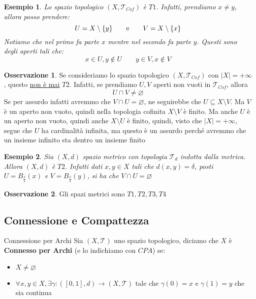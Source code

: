 \documentclass[11pt,a4paper,twoside]{article}
\newtheorem{es}{Esempio}
\theoremstyle{definition}
\newtheorem*{oss}{Osservazione}
\begin{document}
\begin{es}
	Lo spazio topologico $(X, \mathcal T_{Cof})$ è $T1$. Infatti, prendiamo $x \neq y$, allora posso prendere:
	\[U = X \setminus \{y\}\qquad \text e\qquad V = X \setminus \{x\}\]
	Notiamo che nel primo fa parte $x$ mentre nel secondo fa parte $y$. Questi sono degli aperti tali che:
	\[x \in U, y \not \in U\qquad y \in V, x \not \in V\]
\end{es}

\begin{oss}\label{conngros}
	Se consideriamo lo spazio topologico $(X, \mathcal T_{Cof})$ con $|X|=+\infty$, questo \underline{non è mai} $T2$. Infatti, se prendiamo $U,V$ aperti non vuoti in $\mathcal T_{Cof}$, allora
	\[ U \cap V \neq \varnothing \]
	Se per assurdo infatti avremmo che $V \cap U = \varnothing$, ne seguirebbe che $U \subseteq X \setminus V$. Ma $V$ è un aperto non vuoto, quindi nella topologia cofinita $X \setminus V$ è finito. Ma anche $U$ è un aperto non vuoto, quindi anche $X \setminus U$ è finito, quindi, visto che $|X| = +\infty$, segue che $U$ ha cardinalità infinita, ma questo è un assurdo perché avremmo che un insieme infinito sta dentro un insieme finito
\end{oss}

\begin{es}\label{dT2}
	Sia $(X, d)$ spazio metrico con topologia $\mathcal T_d$ indotta dalla metrica. Allora $(X, d)$ è $T2$.
	Infatti dati $x,y \in X$ tali che $d(x,y) = \delta$, posti $U = B_\frac \delta 2(x)$ e $V = B_\frac \delta 2(y)$, si ha che $V \cap U = \varnothing$
\end{es}

\begin{oss}
	Gli spazi metrici sono $T1,T2,T3,T4$
\end{oss}

\subsection{Connessione e Compattezza}

\begin{defn}{Connessione per Archi}{}
	Sia $(X, \mathcal T)$ uno spazio topologico, diciamo che $X$ è \textbf{Connesso per Archi} (e lo indichiamo con $CPA$) se:
	\begin{itemize}
		\item $X \neq \varnothing$
		\item $\forall x,y \in X, \exists \gamma:([0,1], d) \to (X, \mathcal T)$ tale che $\gamma(0)=x$ e $\gamma(1)=y$ che sia continua
	\end{itemize}
\end{defn}
\end{document}
